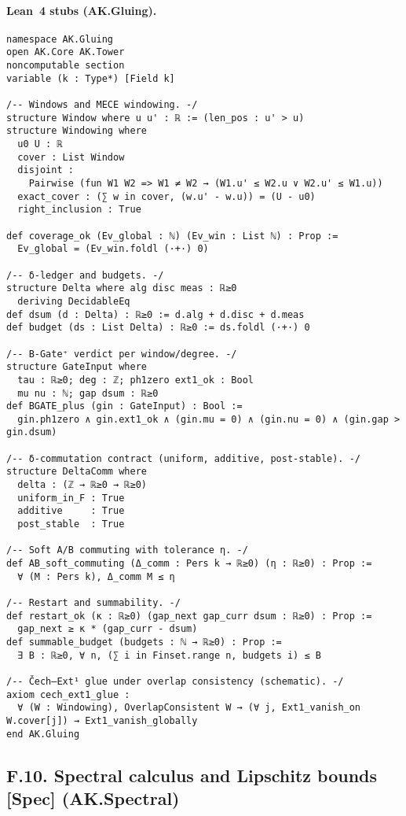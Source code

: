 \documentclass[11pt]{article}
\numberwithin{equation}{section}
\theoremstyle{plain}
\theoremstyle{definition}
\theoremstyle{remark}
\theoremstyle{plain}
\theoremstyle{definition}
\numberwithin{equation}{section}
\theoremstyle{definition}
\numberwithin{equation}{section}
\theoremstyle{plain}
\theoremstyle{definition}
\theoremstyle{remark}
\begin{document}
\paragraph{Lean~4 stubs (AK.Gluing).}
\begin{verbatim}
namespace AK.Gluing
open AK.Core AK.Tower
noncomputable section
variable (k : Type*) [Field k]

/-- Windows and MECE windowing. -/
structure Window where u u' : ℝ := (len_pos : u' > u)
structure Windowing where
  u0 U : ℝ
  cover : List Window
  disjoint :
    Pairwise (fun W1 W2 => W1 ≠ W2 → (W1.u' ≤ W2.u ∨ W2.u' ≤ W1.u))
  exact_cover : (∑ w in cover, (w.u' - w.u)) = (U - u0)
  right_inclusion : True

def coverage_ok (Ev_global : ℕ) (Ev_win : List ℕ) : Prop :=
  Ev_global = (Ev_win.foldl (·+·) 0)

/-- δ-ledger and budgets. -/
structure Delta where alg disc meas : ℝ≥0
  deriving DecidableEq
def dsum (d : Delta) : ℝ≥0 := d.alg + d.disc + d.meas
def budget (ds : List Delta) : ℝ≥0 := ds.foldl (·+·) 0

/-- B-Gate⁺ verdict per window/degree. -/
structure GateInput where
  tau : ℝ≥0; deg : ℤ; ph1zero ext1_ok : Bool
  mu nu : ℕ; gap dsum : ℝ≥0
def BGATE_plus (gin : GateInput) : Bool :=
  gin.ph1zero ∧ gin.ext1_ok ∧ (gin.mu = 0) ∧ (gin.nu = 0) ∧ (gin.gap > gin.dsum)

/-- δ-commutation contract (uniform, additive, post-stable). -/
structure DeltaComm where
  delta : (ℤ → ℝ≥0 → ℝ≥0)
  uniform_in_F : True
  additive     : True
  post_stable  : True

/-- Soft A/B commuting with tolerance η. -/
def AB_soft_commuting (Δ_comm : Pers k → ℝ≥0) (η : ℝ≥0) : Prop :=
  ∀ (M : Pers k), Δ_comm M ≤ η

/-- Restart and summability. -/
def restart_ok (κ : ℝ≥0) (gap_next gap_curr dsum : ℝ≥0) : Prop :=
  gap_next ≥ κ * (gap_curr - dsum)
def summable_budget (budgets : ℕ → ℝ≥0) : Prop :=
  ∃ B : ℝ≥0, ∀ n, (∑ i in Finset.range n, budgets i) ≤ B

/-- Čech–Ext¹ glue under overlap consistency (schematic). -/
axiom cech_ext1_glue :
  ∀ (W : Windowing), OverlapConsistent W → (∀ j, Ext1_vanish_on W.cover[j]) → Ext1_vanish_globally
end AK.Gluing
\end{verbatim}

\subsection*{F.10. Spectral calculus and Lipschitz bounds [Spec] (AK.Spectral)}
\end{document}

